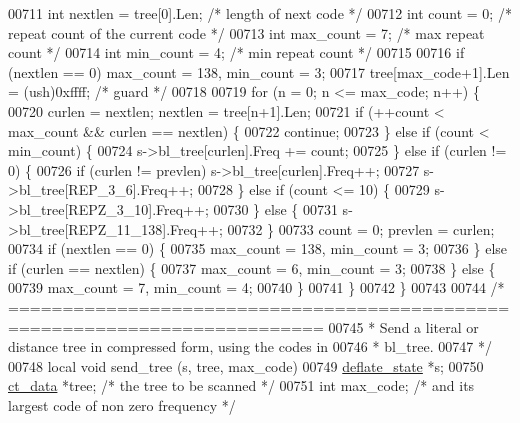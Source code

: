 \begin{DoxyCode}
{{{{{{{{{{{{{00711     \textcolor{keywordtype}{int} nextlen = tree[0].Len; \textcolor{comment}{/* length of next code */}
00712     \textcolor{keywordtype}{int} count = 0;             \textcolor{comment}{/* repeat count of the current code */}
00713     \textcolor{keywordtype}{int} max\_count = 7;         \textcolor{comment}{/* max repeat count */}
00714     \textcolor{keywordtype}{int} min\_count = 4;         \textcolor{comment}{/* min repeat count */}
00715 
00716     \textcolor{keywordflow}{if} (nextlen == 0) max\_count = 138, min\_count = 3;
00717     tree[max\_code+1].Len = (ush)0xffff; \textcolor{comment}{/* guard */}
00718 
00719     \textcolor{keywordflow}{for} (n = 0; n <= max\_code; n++) \{
00720         curlen = nextlen; nextlen = tree[n+1].Len;
00721         \textcolor{keywordflow}{if} (++count < max\_count && curlen == nextlen) \{
00722             \textcolor{keywordflow}{continue};
00723         \} \textcolor{keywordflow}{else} \textcolor{keywordflow}{if} (count < min\_count) \{
00724             s->bl\_tree[curlen].Freq += count;
00725         \} \textcolor{keywordflow}{else} \textcolor{keywordflow}{if} (curlen != 0) \{
00726             \textcolor{keywordflow}{if} (curlen != prevlen) s->bl\_tree[curlen].Freq++;
00727             s->bl\_tree[REP\_3\_6].Freq++;
00728         \} \textcolor{keywordflow}{else} \textcolor{keywordflow}{if} (count <= 10) \{
00729             s->bl\_tree[REPZ\_3\_10].Freq++;
00730         \} \textcolor{keywordflow}{else} \{
00731             s->bl\_tree[REPZ\_11\_138].Freq++;
00732         \}
00733         count = 0; prevlen = curlen;
00734         \textcolor{keywordflow}{if} (nextlen == 0) \{
00735             max\_count = 138, min\_count = 3;
00736         \} \textcolor{keywordflow}{else} \textcolor{keywordflow}{if} (curlen == nextlen) \{
00737             max\_count = 6, min\_count = 3;
00738         \} \textcolor{keywordflow}{else} \{
00739             max\_count = 7, min\_count = 4;
00740         \}
00741     \}
00742 \}
00743 
00744 \textcolor{comment}{/* ===========================================================================}
00745 \textcolor{comment}{ * Send a literal or distance tree in compressed form, using the codes in}
00746 \textcolor{comment}{ * bl\_tree.}
00747 \textcolor{comment}{ */}
00748 local \textcolor{keywordtype}{void} send\_tree (s, tree, max\_code)
00749     \hyperlink{structinternal__state}{deflate\_state} *s;
00750     \hyperlink{structct__data__s}{ct\_data} *tree; \textcolor{comment}{/* the tree to be scanned */}
00751     \textcolor{keywordtype}{int} max\_code;       \textcolor{comment}{/* and its largest code of non zero frequency */}
}}}}}}}}}}}}}
\end{DoxyCode}
